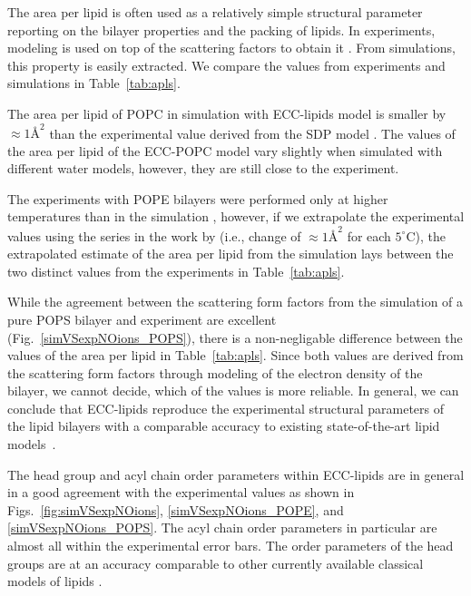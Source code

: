 The area per lipid is often used as a relatively simple structural parameter reporting on the bilayer properties and the packing of lipids. 
In experiments, modeling is used on top of the scattering factors to obtain it \citep{kucerka14}. 
From simulations, this property is easily extracted. 
We compare the values from experiments and simulations in Table~\ref{tab:apls}. 

The area per lipid of POPC in simulation with ECC-lipids model is smaller by $\approx 1Å^2$ 
than the experimental value derived from the SDP model \citep{kucerka14}. 
The values of the area per lipid of the ECC-POPC model vary slightly 
when simulated with different water models, however,
they are still close to the experiment. \citep{melcr18}


The experiments with POPE bilayers were performed only at higher temperatures than in the simulation \citep{parsegian89, rappolt03},
however, if we extrapolate the experimental values using the series in the work by \citet{rappolt03} 
(i.e., change of $\approx 1Å^2$ for each $5^\circ$C), 
the extrapolated estimate of the area per lipid from the simulation 
lays between the two distinct values from the experiments in Table~\ref{tab:apls}. 


While the agreement between the scattering form factors 
from the simulation of a pure POPS bilayer and experiment 
are excellent (Fig.~\ref{simVSexpNOions_POPS}),
there is a non-negligable difference between the values of the area per lipid in Table~\ref{tab:apls}. 
Since both values are derived from the scattering form factors through modeling of the electron density of the bilayer,
we cannot decide, which of the values is more reliable. 
In general, we can conclude that ECC-lipids
reproduce the experimental structural parameters of the lipid bilayers 
with a comparable accuracy to existing state-of-the-art lipid models~\citep{botan15, ollila16, Pluhackova2016}. 
 
The head group and acyl chain order parameters within ECC-lipids
are in general in a good agreement with the experimental values 
as shown in Figs.~\ref{fig:simVSexpNOions}, \ref{simVSexpNOions_POPE},  and \ref{simVSexpNOions_POPS}. 
The acyl chain order parameters in particular are almost all within the experimental error bars.
The order parameters of the head groups are at an accuracy comparable to 
other currently available classical models of lipids \citep{botan15, catte16, Pluhackova2016}. 

